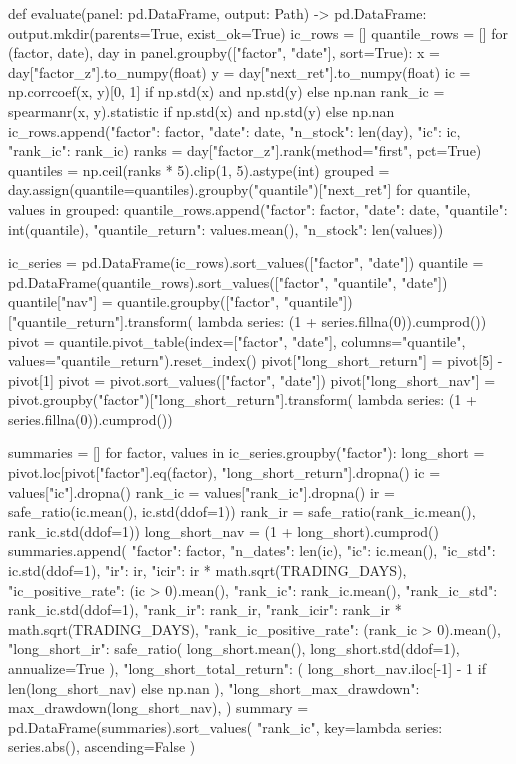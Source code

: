 \documentclass[UTF8,a4paper,fontset=fandol]{ctexart}
\begin{document}
\begin{ProjectCode}
{def evaluate(panel: pd.DataFrame, output: Path) -> pd.DataFrame:
    output.mkdir(parents=True, exist_ok=True)
    ic_rows = []
    quantile_rows = []
    for (factor, date), day in panel.groupby(["factor", "date"], sort=True):
        x = day["factor_z"].to_numpy(float)
        y = day["next_ret"].to_numpy(float)
        ic = np.corrcoef(x, y)[0, 1] if np.std(x) and np.std(y) else np.nan
        rank_ic = spearmanr(x, y).statistic if np.std(x) and np.std(y) else np.nan
        ic_rows.append({"factor": factor, "date": date, "n_stock": len(day),
                        "ic": ic, "rank_ic": rank_ic})
        ranks = day["factor_z"].rank(method="first", pct=True)
        quantiles = np.ceil(ranks * 5).clip(1, 5).astype(int)
        grouped = day.assign(quantile=quantiles).groupby("quantile")["next_ret"]
        for quantile, values in grouped:
            quantile_rows.append({"factor": factor, "date": date,
                                  "quantile": int(quantile),
                                  "quantile_return": values.mean(),
                                  "n_stock": len(values)})

    ic_series = pd.DataFrame(ic_rows).sort_values(["factor", "date"])
    quantile = pd.DataFrame(quantile_rows).sort_values(["factor", "quantile", "date"])
    quantile["nav"] = quantile.groupby(["factor", "quantile"])["quantile_return"].transform(
        lambda series: (1 + series.fillna(0)).cumprod())
    pivot = quantile.pivot_table(index=["factor", "date"], columns="quantile",
                                 values="quantile_return").reset_index()
    pivot["long_short_return"] = pivot[5] - pivot[1]
    pivot = pivot.sort_values(["factor", "date"])
    pivot["long_short_nav"] = pivot.groupby("factor")["long_short_return"].transform(
        lambda series: (1 + series.fillna(0)).cumprod())

    summaries = []
    for factor, values in ic_series.groupby("factor"):
        long_short = pivot.loc[pivot["factor"].eq(factor), "long_short_return"].dropna()
        ic = values["ic"].dropna()
        rank_ic = values["rank_ic"].dropna()
        ir = safe_ratio(ic.mean(), ic.std(ddof=1))
        rank_ir = safe_ratio(rank_ic.mean(), rank_ic.std(ddof=1))
        long_short_nav = (1 + long_short).cumprod()
        summaries.append({
            "factor": factor,
            "n_dates": len(ic),
            "ic": ic.mean(),
            "ic_std": ic.std(ddof=1),
            "ir": ir,
            "icir": ir * math.sqrt(TRADING_DAYS),
            "ic_positive_rate": (ic > 0).mean(),
            "rank_ic": rank_ic.mean(),
            "rank_ic_std": rank_ic.std(ddof=1),
            "rank_ir": rank_ir,
            "rank_icir": rank_ir * math.sqrt(TRADING_DAYS),
            "rank_ic_positive_rate": (rank_ic > 0).mean(),
            "long_short_ir": safe_ratio(
                long_short.mean(), long_short.std(ddof=1), annualize=True
            ),
            "long_short_total_return": (
                long_short_nav.iloc[-1] - 1 if len(long_short_nav) else np.nan
            ),
            "long_short_max_drawdown": max_drawdown(long_short_nav),
        })
    summary = pd.DataFrame(summaries).sort_values(
        "rank_ic", key=lambda series: series.abs(), ascending=False
    )

}
\end{ProjectCode}
\end{document}
